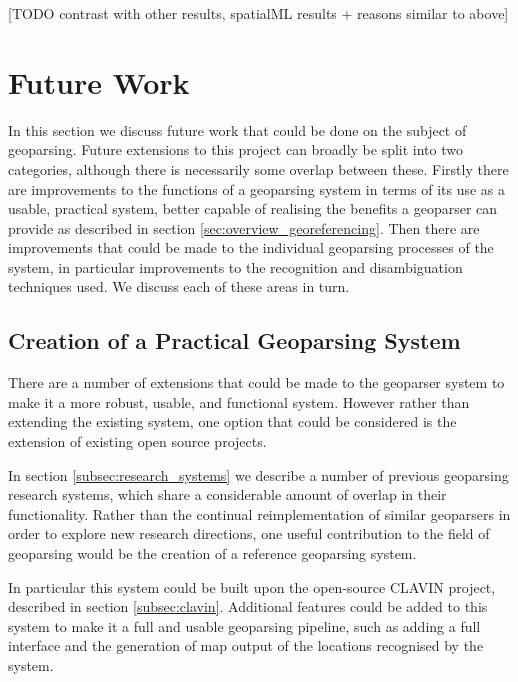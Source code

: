 \documentclass[12pt, a4paper]{report}
\begin{document}
[TODO contrast with other results, spatialML results + reasons similar to above]





\section{Future Work}

In this section we discuss future work that could be done on the subject of geoparsing. Future extensions to this project can broadly be split into two categories, although there is necessarily some overlap between these. Firstly there are improvements to the functions of a geoparsing system in terms of its use as a usable, practical system, better capable of realising the benefits a geoparser can provide as described in section \ref{sec:overview_georeferencing}. Then there are improvements that could be made to the individual geoparsing processes of the system, in particular improvements to the recognition and disambiguation techniques used. We discuss each of these areas in turn.

\subsection{Creation of a Practical Geoparsing System}
\label{subsec:creation_practical_geoparser}

There are a number of extensions that could be made to the geoparser system to make it a more robust, usable, and functional system. However rather than extending the existing system, one option that could be considered is the extension of existing open source projects.

In section \ref{subsec:research_systems} we describe a number of previous geoparsing research systems, which share a considerable amount of overlap in  their functionality. Rather than the continual reimplementation of similar geoparsers in order to explore new research directions, one useful contribution to the field of geoparsing would be the creation of a reference geoparsing system.

In particular this system could be built upon the open-source CLAVIN project, described in section \ref{subsec:clavin}. Additional features could be added to this system to make it a full and usable geoparsing pipeline, such as adding a full interface and the generation of map output of the locations recognised by the system. 
\end{document}
